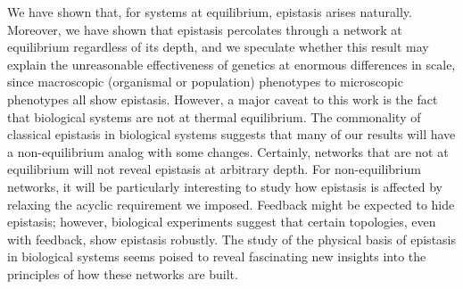 We have shown that, for systems at equilibrium, epistasis arises naturally.
Moreover, we have shown that epistasis percolates through a network at
equilibrium regardless of its depth, and we speculate whether this result may
explain the unreasonable effectiveness of genetics at enormous differences in
scale, since macroscopic (organismal or population) phenotypes to microscopic
phenotypes all show epistasis. However, a major caveat to this work is the
fact that biological systems are not at thermal equilibrium. The commonality of
classical epistasis in biological systems suggests that many of our results will
have a non-equilibrium analog with some changes. Certainly, networks that are
not at equilibrium will not reveal epistasis at arbitrary depth. For
non-equilibrium networks, it will be particularly interesting to study how
epistasis is affected by relaxing the acyclic requirement we imposed. Feedback
might be expected to hide epistasis; however, biological experiments suggest
that certain topologies, even with feedback, show epistasis robustly. The study
of the physical basis of epistasis in biological systems seems poised to reveal
fascinating new insights into the principles of how these networks are built.
